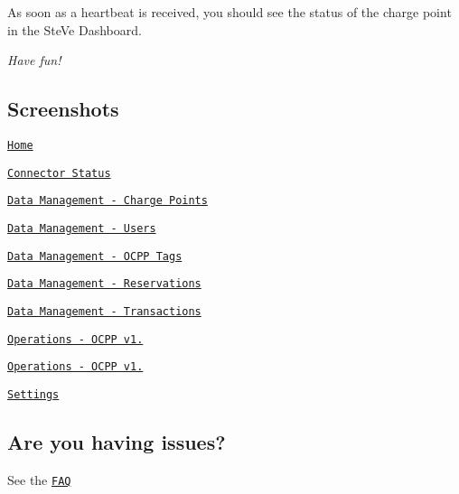 As soon as a heartbeat is received, you should see the status of the charge point in the Ste\-Ve Dashboard.

{\itshape Have fun!}

\subsection*{Screenshots }


\begin{DoxyEnumerate}
\item \href{website/screenshots/home.png}{\tt Home}
\item \href{website/screenshots/connector-status.png}{\tt Connector Status}
\item \href{website/screenshots/chargepoints.png}{\tt Data Management -\/ Charge Points}
\item \href{website/screenshots/users.png}{\tt Data Management -\/ Users}
\item \href{website/screenshots/ocpp-tags.png}{\tt Data Management -\/ O\-C\-P\-P Tags}
\item \href{website/screenshots/reservations.png}{\tt Data Management -\/ Reservations}
\item \href{website/screenshots/transactions.png}{\tt Data Management -\/ Transactions}
\item \href{website/screenshots/ocpp12.png}{\tt Operations -\/ O\-C\-P\-P v1.}
\item \href{website/screenshots/ocpp15.png}{\tt Operations -\/ O\-C\-P\-P v1.}
\item \href{website/screenshots/settings.png}{\tt Settings}
\end{DoxyEnumerate}

\subsection*{Are you having issues? }

See the \href{https://github.com/RWTH-i5-IDSG/steve/wiki/FAQ}{\tt F\-A\-Q} 
